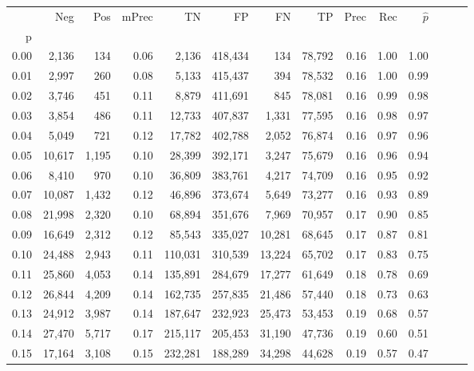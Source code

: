 \begin{tabular}{rrrrrrrrrrrrrr}
\toprule
{} &     Neg &    Pos & mPrec &       TN &       FP &      FN &      TP &  Prec &   Rec & $\hat{p}$ \\
p    &         &        &       &          &          &         &         &       &       &           \\
\midrule
0.00 &   2,136 &    134 &  0.06 &    2,136 &  418,434 &     134 &  78,792 &  0.16 &  1.00 &      1.00 \\
0.01 &   2,997 &    260 &  0.08 &    5,133 &  415,437 &     394 &  78,532 &  0.16 &  1.00 &      0.99 \\
0.02 &   3,746 &    451 &  0.11 &    8,879 &  411,691 &     845 &  78,081 &  0.16 &  0.99 &      0.98 \\
0.03 &   3,854 &    486 &  0.11 &   12,733 &  407,837 &   1,331 &  77,595 &  0.16 &  0.98 &      0.97 \\
0.04 &   5,049 &    721 &  0.12 &   17,782 &  402,788 &   2,052 &  76,874 &  0.16 &  0.97 &      0.96 \\
0.05 &  10,617 &  1,195 &  0.10 &   28,399 &  392,171 &   3,247 &  75,679 &  0.16 &  0.96 &      0.94 \\
0.06 &   8,410 &    970 &  0.10 &   36,809 &  383,761 &   4,217 &  74,709 &  0.16 &  0.95 &      0.92 \\
0.07 &  10,087 &  1,432 &  0.12 &   46,896 &  373,674 &   5,649 &  73,277 &  0.16 &  0.93 &      0.89 \\
0.08 &  21,998 &  2,320 &  0.10 &   68,894 &  351,676 &   7,969 &  70,957 &  0.17 &  0.90 &      0.85 \\
0.09 &  16,649 &  2,312 &  0.12 &   85,543 &  335,027 &  10,281 &  68,645 &  0.17 &  0.87 &      0.81 \\
0.10 &  24,488 &  2,943 &  0.11 &  110,031 &  310,539 &  13,224 &  65,702 &  0.17 &  0.83 &      0.75 \\
0.11 &  25,860 &  4,053 &  0.14 &  135,891 &  284,679 &  17,277 &  61,649 &  0.18 &  0.78 &      0.69 \\
0.12 &  26,844 &  4,209 &  0.14 &  162,735 &  257,835 &  21,486 &  57,440 &  0.18 &  0.73 &      0.63 \\
0.13 &  24,912 &  3,987 &  0.14 &  187,647 &  232,923 &  25,473 &  53,453 &  0.19 &  0.68 &      0.57 \\
0.14 &  27,470 &  5,717 &  0.17 &  215,117 &  205,453 &  31,190 &  47,736 &  0.19 &  0.60 &      0.51 \\
0.15 &  17,164 &  3,108 &  0.15 &  232,281 &  188,289 &  34,298 &  44,628 &  0.19 &  0.57 &      0.47 \\

\end{tabular}
